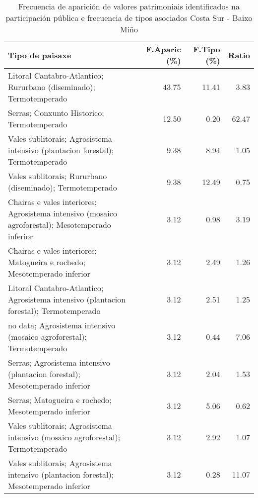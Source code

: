 \begin{table}[p]
\centering
\caption{Frecuencia de aparición de valores patrimoniais identificados na participación pública e frecuencia de tipos asociados Costa Sur - Baixo Miño} 
\label{vsixotpat3}
\begin{tabular}{lrrr}
  \hline
Tipo de paisaxe & F.Aparic (\%) & F.Tipo (\%) & Ratio \\ 
  \hline
Litoral Cantabro-Atlantico; Rururbano (diseminado); Termotemperado & 43.75 & 11.41 & 3.83 \\ 
  Serras; Conxunto Historico; Termotemperado & 12.50 & 0.20 & 62.47 \\ 
  Vales sublitorais; Agrosistema intensivo (plantacion forestal); Termotemperado & 9.38 & 8.94 & 1.05 \\ 
  Vales sublitorais; Rururbano (diseminado); Termotemperado & 9.38 & 12.49 & 0.75 \\ 
  Chairas e vales interiores; Agrosistema intensivo (mosaico agroforestal); Mesotemperado inferior & 3.12 & 0.98 & 3.19 \\ 
  Chairas e vales interiores; Matogueira e rochedo; Mesotemperado inferior & 3.12 & 2.49 & 1.26 \\ 
  Litoral Cantabro-Atlantico; Agrosistema intensivo (plantacion forestal); Termotemperado & 3.12 & 2.51 & 1.25 \\ 
  no data; Agrosistema intensivo (mosaico agroforestal); Termotemperado & 3.12 & 0.44 & 7.06 \\ 
  Serras; Agrosistema intensivo (plantacion forestal); Mesotemperado inferior & 3.12 & 2.04 & 1.53 \\ 
  Serras; Matogueira e rochedo; Mesotemperado inferior & 3.12 & 5.06 & 0.62 \\ 
  Vales sublitorais; Agrosistema intensivo (mosaico agroforestal); Termotemperado & 3.12 & 2.92 & 1.07 \\ 
  Vales sublitorais; Agrosistema intensivo (plantacion forestal); Mesotemperado inferior & 3.12 & 0.28 & 11.07 \\ 
   \hline
\end{tabular}
\end{table}
